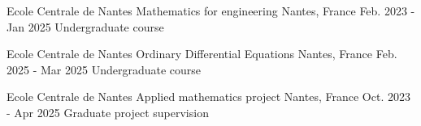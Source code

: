 

\begin{cvcompactentries}



\cvcompactentry
{Ecole Centrale de Nantes} %
{Mathematics for engineering} %
{Nantes, France} %
{Feb. 2023 - Jan 2025} %
{Undergraduate course} %


\cvcompactentry
{Ecole Centrale de Nantes} %
{Ordinary Differential Equations} %
{Nantes, France} %
{Feb. 2025 - Mar 2025} %
{Undergraduate course} %


\cvcompactentry
{Ecole Centrale de Nantes} %
{Applied mathematics project} %
{Nantes, France} %
{Oct. 2023 - Apr 2025} %
{Graduate project supervision} %



\end{cvcompactentries}
